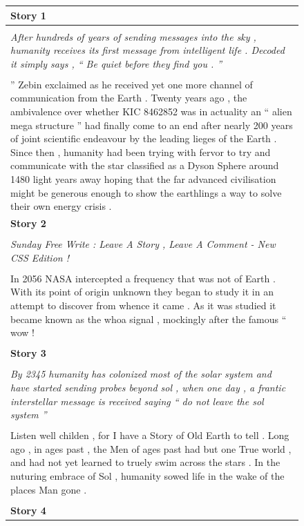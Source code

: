 \documentclass{article}
\begin{document}
\begin{figure}[h]
\centering
\small
\begin{tabular}{|p{\textwidth}|}
\hline
\textbf{Story 1}
\\
\hline
\\
\textit{After hundreds of years of sending messages into the sky , humanity receives its first message from intelligent life . Decoded it simply says , `` Be quiet before they find you . ''}
\\
\\
'' Zebin exclaimed as he received yet one more channel of communication from the Earth .
Twenty years ago , the ambivalence over whether KIC 8462852 was in actuality an `` alien mega structure '' had finally come to an end after nearly 200 years of joint scientific endeavour by the leading lieges of the Earth .
Since then , humanity had been trying with fervor to try and communicate with the star classified as a Dyson Sphere around 1480 light years away hoping that the far advanced civilisation might be generous enough to show the earthlings a way to solve their own energy crisis .
\\
\hline
\textbf{Story 2}
\\
\hline
\\
\textit{Sunday Free Write : Leave A Story , Leave A Comment - New CSS Edition !}
\\
\\
In 2056 NASA intercepted a frequency that was not of Earth .
With its point of origin unknown they began to study it in an attempt to discover from whence it came .
As it was studied it became known as the whoa signal , mockingly after the famous `` wow !
\\
\\
\hline
\textbf{Story 3}
\\
\hline
\\
\textit{By 2345 humanity has colonized most of the solar system and have started sending probes beyond sol , when one day , a frantic interstellar message is received saying `` do not leave the sol system ''}
\\
\\
Listen well childen , for I have a Story of Old Earth to tell .
Long ago , in ages past , the Men of ages past had but one True world , and had not yet learned to truely swim across the stars .
In the nuturing embrace of Sol , humanity sowed life in the wake of the places Man gone .
\\
\\
\hline
\textbf{Story 4}

\end{tabular}
\end{figure}
\end{document}
